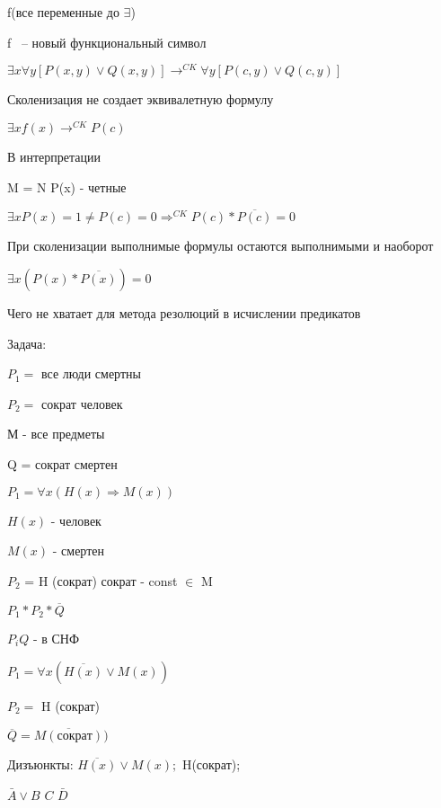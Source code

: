 \documentclass[russian]{lecture-notes}
\begin{document}
    f(все переменные до $\exists$)

    f ~-- новый функциональный символ


    \begin{example}

        $\exists x \forall y [P(x,y) \lor Q(x,y)] \rightarrow^{CK} \forall y [P(c,y) \lor Q(c,y)]$

        \begin{remark}

            Сколенизация не создает эквивалетную формулу

            \end{remark}

        $\exists x f(x) \rightarrow^{CK} P(c)$

        В интерпретации

        M = N \quad P(x) - четные

        $\exists x P(x) = 1 \neq P(c) = 0 \Rightarrow^{CK} P(c) * \overline{P(c)} = 0 $

        \begin{theorem}

        При сколенизации выполнимые формулы остаются выполнимыми и наоборот

        \end{theorem}

    \begin{example}

        $\exists x (P(x) * \overline{P(x)}) = 0 $

        \end{example}


        Чего не хватает для метода резолюций в исчислении предикатов


        Задача:

        $P_{1} = $ все люди смертны

        $P_{2} = $ сократ человек

        М - все предметы

        Q = сократ смертен

        $P_{1} = \forall x (H(x) \Rightarrow M(x))$

        $H(x) $ - человек

        $M(x)$ - смертен

        $P_2$ = H (сократ) \quad \quad сократ - const $\in$ M

        $P_{1} * P_{2} * \overline{Q}$

        $P_{i}Q$ - в СНФ

        $P_{1} = \forall x (\overline{H(x)} \lor M(x))$

        $P_{2} = $ H (сократ)

        $\overline{Q} = \overline{M(сократ)})$

        Дизъюнкты: $\overline{H(x)} \lor M(x);$ H(сократ); 

        \qquad \qquad \qquad $\bar{A} \lor B$ \qquad \qquad $C$ \qquad \qquad $\bar{D}$

        \end{example}
\end{document}
